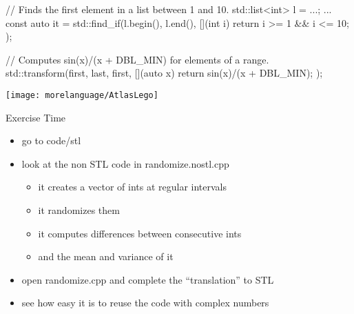 \begin{frame}[fragile]
  \begin{cppcode}
    // Finds the first element in a list between 1 and 10.
    std::list<int> l = ...;
    ...
    const auto it =
      std::find_if(l.begin(), l.end(),
        [](int i) { return i >= 1 && i <= 10; });

    // Computes sin(x)/(x + DBL_MIN) for elements of a range.
    std::transform(first, last, first,
      [](auto x) { return sin(x)/(x + DBL_MIN); });
  \end{cppcode}
\end{frame}

\begin{frame}[fragile]
  \begin{block}{}
    \texttt{[image: morelanguage/AtlasLego]}
  \end{block}
\end{frame}

\begin{frame}[fragile]
  \begin{alertblock}{Exercise Time}
    \begin{itemize}
    \item go to code/stl
    \item look at the non STL code in randomize.nostl.cpp
      \begin{itemize}
        \item it creates a vector of ints at regular intervals
        \item it randomizes them
        \item it computes differences between consecutive ints
        \item and the mean and variance of it
      \end{itemize}
    \item open randomize.cpp and complete the ``translation'' to STL
    \item see how easy it is to reuse the code with complex numbers
    \end{itemize}
  \end{alertblock}
\end{frame}

